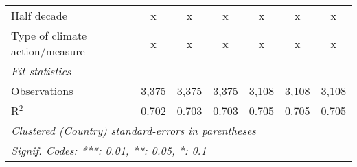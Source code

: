 \begin{tabular}{lcccccc}
   Half decade                                         & x       & x             & x             & x             & x             & x\\  
   Type of climate action/measure                      & x       & x             & x             & x             & x             & x\\  
   \midrule \emph{Fit statistics}\\
   Observations                                        & 3,375   & 3,375         & 3,375         & 3,108         & 3,108         & 3,108\\  
   R$^2$                                               & 0.702   & 0.703         & 0.703         & 0.705         & 0.705         & 0.705\\  
   \midrule
   \multicolumn{7}{l}{\emph{Clustered (Country) standard-errors in parentheses}}\\
   \multicolumn{7}{l}{\emph{Signif. Codes: ***: 0.01, **: 0.05, *: 0.1}}\\
\end{tabular}
\par\endgroup


